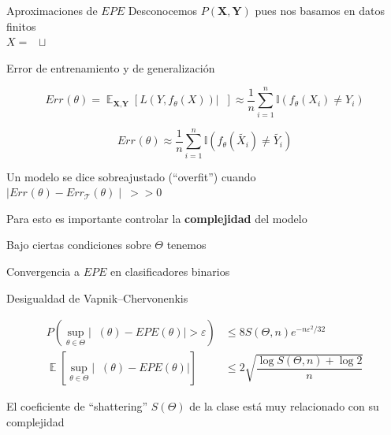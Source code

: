 \documentclass[xcolor=x11names]{beamer}
\DeclareMathOperator{\Expect}{\mathbb{E}}
\DeclareMathOperator{\trainsetn}{\mathcal{T}^{(n)}}
\DeclareMathOperator{\trainset}{\mathcal{T}}
\DeclareMathOperator{\testsetn}{\mathcal{T_s}^{(n)}}
\DeclareMathOperator{\testset}{\mathcal{T_s}}
\begin{document}
\begin{frame}{Aproximaciones de $EPE$}
	\centering
	Desconocemos $P(\textbf{X},\textbf{Y})$ pues nos basamos en datos finitos\\

	$X = \trainsetn \sqcup \testsetn$

    \begin{block}{Error de entrenamiento y de generalización}

        $$  Err_{\trainsetn}(\theta) =
        \Expect_{ \textbf{X}, \textbf{Y} } \left[ L(Y,f_{\theta}(X))  |  \trainsetn \right] \approx
        \dfrac{1}{n} \sum_{i=1}^{n} \mathbb{I} \left(f_\theta (X_{i})\neq Y_{i} \right)  $$

        $$Err_{\testsetn}(\theta) \approx
        \dfrac{1}{n} \sum_{i=1}^{n} \mathbb{I} \left(f_\theta (\tilde{X_{i}})\neq \tilde{Y_{i}} \right)  $$

	\end{block}

	Un modelo se dice sobreajustado (``overfit'') cuando $\mid Err_{\testset}(\theta) - Err_{\trainset}(\theta)  \mid \ >> 0$

	Para esto es importante controlar la \textbf{complejidad} del modelo

\end{frame}


Bajo ciertas condiciones sobre $\Theta$ tenemos
\begin{frame}{Convergencia a $EPE$ en clasificadores binarios}

	\begin{block}{Desigualdad de Vapnik–Chervonenkis}

		\begin{equation}
			\begin{split}
				P\left(\sup_{\theta\in \Theta}\left|\trainsetn(\theta)-EPE (\theta)\right|>\varepsilon \right) & \leq
				8S (\Theta,n) e^{{-n \varepsilon^{2}/32}}\\
				\Expect\left[\sup_{\theta \in \Theta}\left| \trainsetn(\theta)-EPE (\theta)\right|\right] &
				\leq 2\sqrt{\dfrac{\log S(\Theta,n)+\log2}{n}}
			\end{split}
		\end{equation}

	\end{block}

El coeficiente de ``shattering'' $S(\Theta)$ de la clase está muy relacionado con su complejidad
\end{frame}
\end{document}

